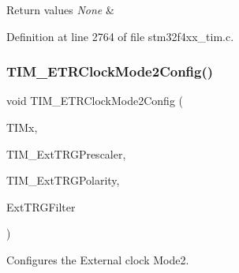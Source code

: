 \begin{DoxyRetVals}{Return values}
{\em None} & \\
\hline
\end{DoxyRetVals}


Definition at line 2764 of file stm32f4xx\+\_\+tim.\+c.

\mbox{\label{group___t_i_m_ga0a9cbcbab32326cbbdaf4c111f59ec20}} 
\subsubsection{\texorpdfstring{T\+I\+M\+\_\+\+E\+T\+R\+Clock\+Mode2\+Config()}{TIM\_ETRClockMode2Config()}}
{\footnotesize\ttfamily void T\+I\+M\+\_\+\+E\+T\+R\+Clock\+Mode2\+Config (\begin{DoxyParamCaption}\item[{\hyperlink{struct_t_i_m___type_def}{T\+I\+M\+\_\+\+Type\+Def} $\ast$}]{T\+I\+Mx,  }\item[{uint16\+\_\+t}]{T\+I\+M\+\_\+\+Ext\+T\+R\+G\+Prescaler,  }\item[{uint16\+\_\+t}]{T\+I\+M\+\_\+\+Ext\+T\+R\+G\+Polarity,  }\item[{uint16\+\_\+t}]{Ext\+T\+R\+G\+Filter }\end{DoxyParamCaption})}



Configures the External clock Mode2. 


